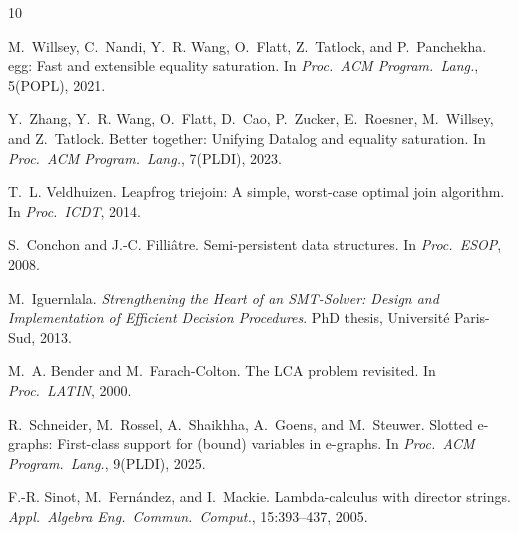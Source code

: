 \documentclass[sigplan,nonacm]{acmart}
\begin{document}

\begin{thebibliography}{10}

M.~Willsey, C.~Nandi, Y.~R. Wang, O.~Flatt, Z.~Tatlock, and
P.~Panchekha.
\newblock egg: Fast and extensible equality saturation.
\newblock In \emph{Proc.\ ACM Program.\ Lang.}, 5(POPL), 2021.

Y.~Zhang, Y.~R. Wang, O.~Flatt, D.~Cao, P.~Zucker, E.~Roesner,
M.~Willsey, and Z.~Tatlock.
\newblock Better together: Unifying {D}atalog and equality saturation.
\newblock In \emph{Proc.\ ACM Program.\ Lang.}, 7(PLDI), 2023.

T.~L. Veldhuizen.
\newblock Leapfrog triejoin: A simple, worst-case optimal join
algorithm.
\newblock In \emph{Proc.\ ICDT}, 2014.

S.~Conchon and J.-C. Filli\^{a}tre.
\newblock Semi-persistent data structures.
\newblock In \emph{Proc.\ ESOP}, 2008.

M.~Iguernlala.
\newblock \emph{Strengthening the Heart of an SMT-Solver: Design and
Implementation of Efficient Decision Procedures}.
\newblock PhD thesis, Universit\'{e} Paris-Sud, 2013.

M.~A. Bender and M.~Farach-Colton.
\newblock The {LCA} problem revisited.
\newblock In \emph{Proc.\ LATIN}, 2000.

R.~Schneider, M.~Rossel, A.~Shaikhha, A.~Goens, and M.~Steuwer.
\newblock Slotted e-graphs: First-class support for (bound) variables
in e-graphs.
\newblock In \emph{Proc.\ ACM Program.\ Lang.}, 9(PLDI), 2025.

F.-R. Sinot, M.~Fern\'{a}ndez, and I.~Mackie.
\newblock Lambda-calculus with director strings.
\newblock \emph{Appl.\ Algebra Eng.\ Commun.\ Comput.}, 15:393--437,
2005.

\end{thebibliography}
\end{document}
